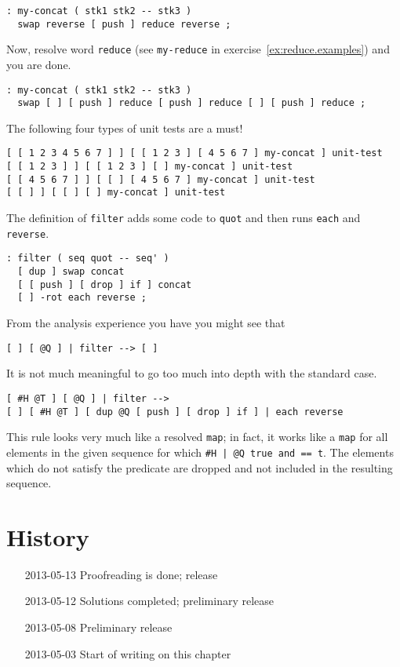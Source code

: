 \begin{verbatim}
: my-concat ( stk1 stk2 -- stk3 )
  swap reverse [ push ] reduce reverse ;
\end{verbatim}

Now, resolve word \verb|reduce| (see \verb|my-reduce| in exercise~\ref{ex:reduce.examples}) and you are done.

\begin{verbatim}
: my-concat ( stk1 stk2 -- stk3 )
  swap [ ] [ push ] reduce [ push ] reduce [ ] [ push ] reduce ;
\end{verbatim}

The following four types of unit tests are a must!

\begin{verbatim}
[ [ 1 2 3 4 5 6 7 ] ] [ [ 1 2 3 ] [ 4 5 6 7 ] my-concat ] unit-test
[ [ 1 2 3 ] ] [ [ 1 2 3 ] [ ] my-concat ] unit-test
[ [ 4 5 6 7 ] ] [ [ ] [ 4 5 6 7 ] my-concat ] unit-test
[ [ ] ] [ [ ] [ ] my-concat ] unit-test
\end{verbatim}

The definition of \verb|filter| adds some code to \verb|quot| and then runs \verb|each| and \verb|reverse|.

\begin{verbatim}
: filter ( seq quot -- seq' )
  [ dup ] swap concat
  [ [ push ] [ drop ] if ] concat
  [ ] -rot each reverse ;
\end{verbatim}

From the analysis experience you have you might see that

\begin{verbatim}
[ ] [ @Q ] | filter --> [ ]
\end{verbatim}

It is not much meaningful to go too much into depth with the standard case.

\begin{verbatim}
[ #H @T ] [ @Q ] | filter -->
[ ] [ #H @T ] [ dup @Q [ push ] [ drop ] if ] | each reverse
\end{verbatim}

This rule looks very much like a resolved \verb|map|; in fact, it works like a \verb|map| for all elements in the given sequence for which \verb!#H | @Q true and == t!. The elements which do not satisfy the predicate are dropped and not included in the resulting sequence. 

\section*{History}
\begin{itemize}
\item[2013-05-13] Proofreading is done; release
\item[2013-05-12] Solutions completed; preliminary release
\item[2013-05-08] Preliminary release
\item[2013-05-03] Start of writing on this chapter
\end{itemize}

